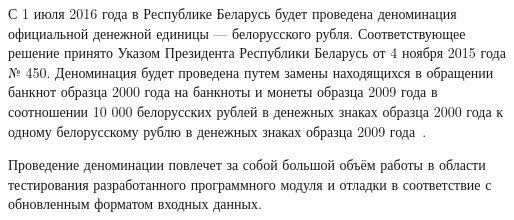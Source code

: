 С 1 июля 2016 года в Республике Беларусь будет проведена деноминация официальной
денежной единицы --- белорусского рубля. Соответствующее решение принято Указом
Президента Республики Беларусь от 4 ноября 2015 года № 450.
Деноминация будет проведена путем замены находящихся в обращении банкнот
образца 2000 года на банкноты и монеты образца 2009 года в соотношении 10 000 белорусских
рублей в денежных знаках образца 2000 года к одному белорусскому рублю в денежных
знаках образца 2009 года~\cite{denomination_decree, denomination_news}.

Проведение деноминации повлечет за собой большой объём работы в области
тестирования разработанного программного модуля и отладки в соответствие с
обновленным форматом входных данных.
